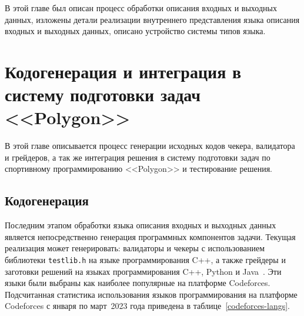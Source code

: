 \documentclass[times,specification,annotation]{style/itmo-student-thesis/itmo-student-thesis}
\begin{document}
\chapterconclusion

В этой главе был описан процесс обработки описания входных и выходных данных, изложены детали реализации внутреннего представления языка описания входных и выходных данных, описано устройство системы типов языка.

\chapter{Кодогенерация и интеграция в систему подготовки задач <<Polygon>>}

В этой главе описывается процесс генерации исходных кодов чекера, валидатора и грейдеров, а так же интеграция решения в систему подготовки задач по спортивному программированию <<Polygon>> и тестирование решения.

\section{Кодогенерация}

Последним этапом обработки языка описания входных и выходных данных является непосредственно генерация программных компонентов задачи. Текущая реализация может генерировать: валидаторы и чекеры с использованием библиотеки \texttt{testlib.h} на языке программирования C++, а также грейдеры и заготовки решений на языках программирования C++, Python и Java~\cite{schildt2022java}. Эти языки были выбраны как наиболее популярные на платформе Codeforces. Подсчитанная статистика использования языков программирования на платформе Codeforces с января по март~2023 года приведена в таблице~\ref{codeforces-langs}.
\end{document}
